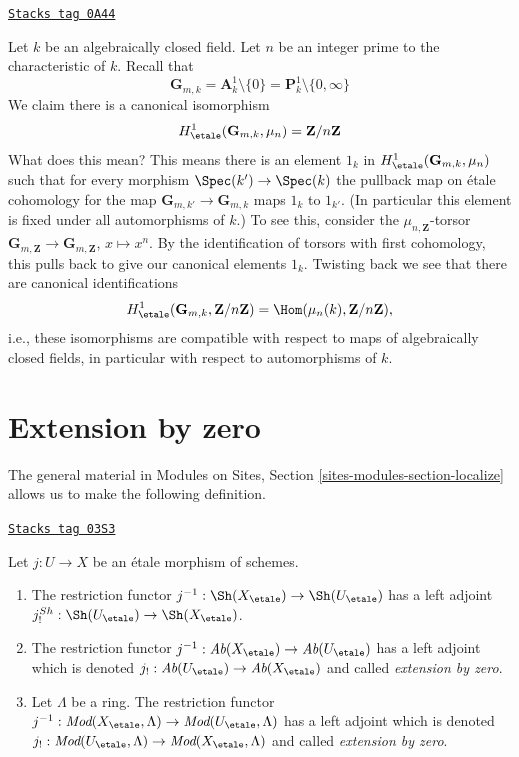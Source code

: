 \begin{remark}[Normalize H1 Gm]
\label{etale-cohomology-remark-normalize-H1-Gm}
\href{https://stacks.math.columbia.edu/tag/0A44}{\texttt{Stacks tag 0A44}}

Let $k$ be an algebraically closed field. Let $n$ be an integer prime to
the characteristic of $k$. Recall that
$$
\mathbf{G}_{m, k} = \mathbf{A}^1_k \setminus \{0\} =
\mathbf{P}^1_k \setminus \{0, \infty\}
$$
We claim there is a canonical isomorphism
$$
H^1_\etale(\mathbf{G}_{m, k}, \mu_n) = \mathbf{Z}/n\mathbf{Z}
$$
What does this mean? This means there is an element $1_k$ in
$H^1_\etale(\mathbf{G}_{m, k}, \mu_n)$ such that for
every morphism $\Spec(k') \to \Spec(k)$ the pullback map on
\'etale cohomology for the map $\mathbf{G}_{m, k'} \to \mathbf{G}_{m, k}$
maps $1_k$ to $1_{k'}$. (In particular this element is
fixed under all automorphisms of $k$.) To see this, consider the
$\mu_{n, \mathbf{Z}}$-torsor
$\mathbf{G}_{m, \mathbf{Z}} \to \mathbf{G}_{m, \mathbf{Z}}$,
$x \mapsto x^n$. By the identification of torsors with
first cohomology, this pulls back to give our canonical elements $1_k$.
Twisting back we see that there are canonical identifications
$$
H^1_\etale(\mathbf{G}_{m, k}, \mathbf{Z}/n\mathbf{Z}) =
\Hom(\mu_n(k), \mathbf{Z}/n\mathbf{Z}),
$$
i.e., these isomorphisms are compatible with respect to maps of
algebraically closed fields, in particular with respect to
automorphisms of $k$.
\end{remark}

\section{Extension by zero}
\label{etale-cohomology-section-extension-by-zero}
The general material in
Modules on Sites, Section \ref{sites-modules-section-localize}
allows us to make the following definition.

\begin{definition}
\label{etale-cohomology-definition-extension-zero}
\href{https://stacks.math.columbia.edu/tag/03S3}{\texttt{Stacks tag 03S3}}

Let $j : U \to X$ be an \'etale morphism of schemes.
\begin{enumerate}
\item The restriction functor
$j^{-1} : \Sh(X_\etale) \to \Sh(U_\etale)$
has a left adjoint
$j_!^{Sh} : \Sh(U_\etale) \to \Sh(X_\etale)$.
\item The restriction functor
$j^{-1} : \textit{Ab}(X_\etale) \to \textit{Ab}(U_\etale)$
has a left adjoint which is denoted
$j_! : \textit{Ab}(U_\etale) \to \textit{Ab}(X_\etale)$
and called {\it extension by zero}.
\item Let $\Lambda$ be a ring. The restriction functor
$j^{-1} : \textit{Mod}(X_\etale, \Lambda) \to
\textit{Mod}(U_\etale, \Lambda)$
has a left adjoint which is denoted
$j_! : \textit{Mod}(U_\etale, \Lambda) \to
\textit{Mod}(X_\etale, \Lambda)$
and called {\it extension by zero}.
\end{enumerate}
\end{definition}

